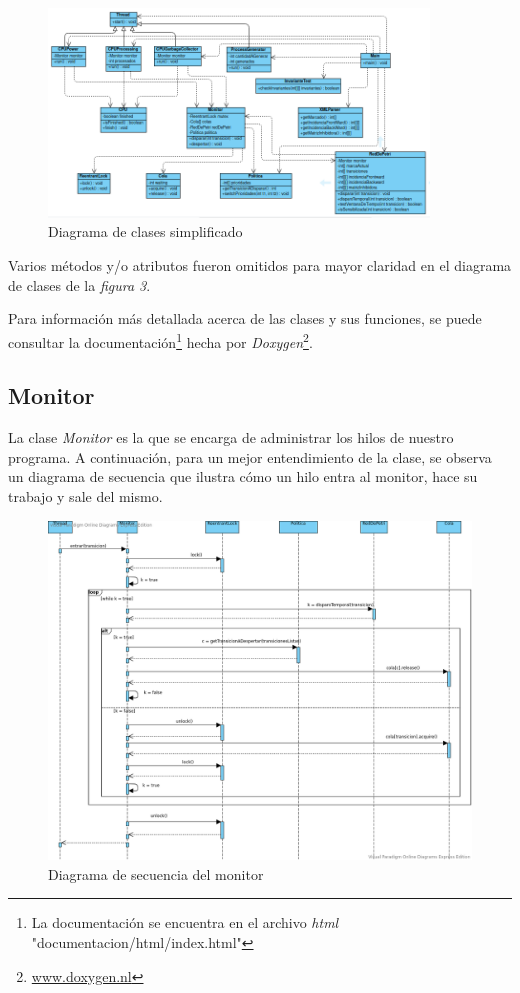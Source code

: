 \documentclass{article}
\newcommand{\fndoc}{La documentación se encuentra en el archivo \emph{html} "documentacion/html/index.html"}
\newcommand{\fndoxy}{\url{www.doxygen.nl}}
\begin{document}
    \begin{figure}[H]
        \includegraphics[width=0.9\textwidth, center]{diagrama-clases.png}
        \caption{Diagrama de clases simplificado}
    \end{figure}
    Varios métodos y/o atributos fueron omitidos para mayor claridad en el diagrama de clases
    de la \emph{figura 3}. \par   
    Para información más detallada acerca de las clases y  sus funciones, se puede consultar
    la documentación\footnote{\fndoc} hecha por \emph{Doxygen}\footnote{\fndoxy}.
    \subsection{Monitor}
    La clase \emph{Monitor} es la que se encarga de administrar los hilos de nuestro programa.
    A continuación, para un mejor entendimiento de la clase, se observa un diagrama de secuencia
    que ilustra cómo un hilo entra al monitor, hace su trabajo y sale del mismo.
    \begin{figure}[H]
        \includegraphics[width=1.2\textwidth, center]{secuencia-monitor.png}
        \caption{Diagrama de secuencia del monitor}
    \end{figure}
\end{document}
